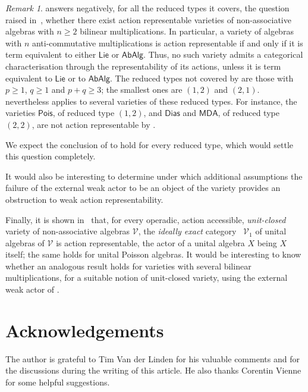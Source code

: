 \documentclass[reqno,a4paper]{amsart}
\theoremstyle{plain}
\theoremstyle{definition}
\theoremstyle{remark}
\newtheorem{remark}[subsection]{Remark}
\numberwithin{equation}{section}
\newcommand{\V}{\mathcal{V}}
\newcommand{\Lie}{\ensuremath{\mathsf{Lie}}}
\newcommand{\Pois}{\ensuremath{\mathsf{Pois}}}
\newcommand{\AbAlg}{\ensuremath{\mathsf{AbAlg}}}
\newcommand{\Match}{\ensuremath{\mathsf{MDA}}}
\newcommand{\Dias}{\ensuremath{\mathsf{Dias}}}
\begin{document}
\begin{remark}\label{RemarkNoCategoricalDefinition}
 answers negatively, for all the reduced types it covers, the question raised in~\cite[Section~6.6]{Tim}, whether there exist action representable varieties of non-associative algebras with $n\geq2$ bilinear multiplications. In particular, a variety of algebras with $n$ anti-commutative multiplications is action representable if and only if it is term equivalent to either $\Lie$ or $\AbAlg$. Thus, no such variety admits a categorical characterisation through the representability of its actions, unless it is term equivalent to $\Lie$ or to $\AbAlg$. The reduced types not covered by  are those with $p\geq1$, $q\geq1$ and $p+q\geq3$; the smallest ones are $(1,2)$ and $(2,1)$.  nevertheless applies to several varieties of these reduced types. For instance, the varieties $\Pois$, of reduced type $(1,2)$, and $\Dias$ and $\Match$, of reduced type $(2,2)$, are not action representable by .

We expect the conclusion of  to hold for every reduced type, which would settle this question completely. 

It would also be interesting to determine under which additional assumptions the failure of the external weak actor to be an object of the variety provides an obstruction to weak action representability.

Finally, it is shown in~\cite{MPV} that, for every operadic, action accessible, \emph{unit-closed} variety of non-associative algebras $\V$, the \emph{ideally exact} category~\cite{IdeallyExact} $\V_1$ of unital algebras of $\V$ is action representable, the actor of a unital algebra $X$ being $X$ itself; the same holds for unital Poisson algebras. It would be interesting to know whether an analogous result holds for varieties with several bilinear multiplications, for a suitable notion of unit-closed variety, using the external weak actor of .
\end{remark}

\section*{Acknowledgements}
The author is grateful to Tim Van der Linden for his valuable comments and for the discussions during the writing of this article. He also thanks Corentin Vienne for some helpful suggestions.
\end{document}

